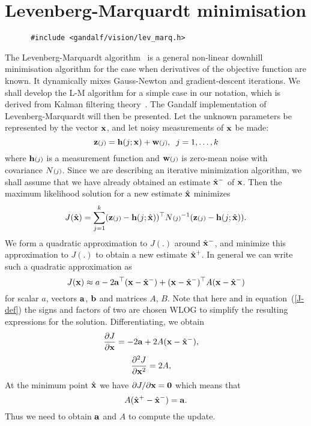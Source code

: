 \section{Levenberg-Marquardt minimisation}
\begin{verbatim}
      #include <gandalf/vision/lev_marq.h>
\end{verbatim}
The Levenberg-Marquardt
algorithm~\cite{Marquardt:JSIAM63,Bjorck:96}
is a general non-linear downhill minimisation algorithm
for the case when derivatives of the objective function are known.
It dynamically mixes Gauss-Newton and gradient-descent iterations.
We shall develop the L-M algorithm for a simple
case in our notation, which is derived from Kalman filtering
theory~\cite{BarShalom:Fortmann:88}. The Gandalf implementation of
Levenberg-Marquardt will then be presented. Let the unknown parameters be
represented by the vector ${\bf x}$, and let noisy measurements of
${\bf x}$ be made:
\begin{equation}
 {\bf z}{\scriptstyle (j)} = {\bf h}(j;{\bf x}) + {\bf w}{\scriptstyle (j)},\;\;j=1,\ldots,k
 \label{measure_equation}
\end{equation}
where ${\bf h}{\scriptstyle (j)}$ is a measurement function and ${\bf w}{\scriptstyle (j)}$ is zero-mean
noise with covariance $N{\scriptstyle (j)}$. Since we are describing an iterative
minimization algorithm, we shall assume that we have already obtained
an estimate $\hat{\bf x}^-$ of ${\bf x}$.
Then the maximum likelihood solution for a new estimate $\hat{\bf x}$ minimizes
\begin{equation}
 J(\hat{\bf x}) = \sum_{j=1}^k ({\bf z}{\scriptstyle (j)}-{\bf h}(j;\hat{\bf x}))^{\top} N{\scriptstyle (j)}^{-1} ({\bf z}{\scriptstyle (j)}-{\bf h}(j;\hat{\bf x})).
 \label{J-def}
\end{equation}
We form a quadratic approximation to $J(.)$ around $\hat{\bf x}^-$, and minimize
this approximation to $J(.)$ to obtain a new estimate $\hat{\bf x}^+$.
In general we can write such a quadratic approximation as
\[ J({\bf x}) \approx a - 2{\bf a}^{\top}({\bf x}-\hat{\bf x}^-) + ({\bf x}-\hat{\bf x}^-)^{\top} A ({\bf x}-\hat{\bf x}^-)
\]
for scalar $a$, vectors ${\bf a}$, ${\bf b}$ and matrices $A$, $B$.
Note that here and in equation~(\ref{J-def}) the signs and factors of two
are chosen WLOG to simplify the resulting expressions for the solution.
Differentiating, we obtain
\[
 \frac{\partial J}{\partial {\bf x}} = - 2{\bf a} + 2A({\bf x}-\hat{\bf x}^-), \;\;\;\;
\]
\[
 \frac{\partial^2 J}{\partial {\bf x}^2} = 2A, \;\;\;\;
\]
At the minimum point $\hat{\bf x}$ we have $\partial J/\partial {\bf x}={\bf 0}$
which means that
\begin{equation}
 A (\hat{\bf x}^+-\hat{\bf x}^-) = {\bf a}.
 \label{J-min}
\end{equation}
Thus we need to obtain ${\bf a}$ and $A$ to compute the update.

